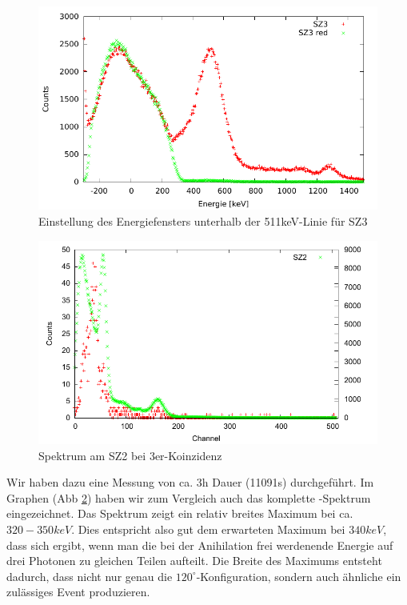 \begin{figure}[H]
 \includegraphics[width=\textwidth]{Graphen/3er/red-spektrum-sz3.pdf}
 \caption{Einstellung des Energiefensters unterhalb der 511keV-Linie für SZ3}
 \label{graphen-3er-red-spektrum-sz3}
\end{figure}

\begin{figure}[H]
 \includegraphics[width=\textwidth]{Graphen/3er/spektrum-2.pdf}
 \caption{Spektrum am SZ2 bei 3er-Koinzidenz}
 \label{graphen-3er-spektrum-2}
\end{figure}

Wir haben dazu eine Messung von ca. 3h Dauer (11091s) durchgeführt. Im Graphen (Abb \ref{graphen-3er-spektrum-2}) haben wir zum Vergleich auch das komplette \Na-Spektrum eingezeichnet. Das Spektrum zeigt ein relativ breites Maximum bei ca. $320-350 keV$. Dies entspricht also gut dem erwarteten Maximum bei $340 keV$, dass sich ergibt, wenn man die bei der Anihilation frei werdenende Energie auf drei Photonen zu gleichen Teilen aufteilt. Die Breite des Maximums entsteht dadurch, dass nicht nur genau die $120^\circ$-Konfiguration, sondern auch ähnliche ein zulässiges Event produzieren.

